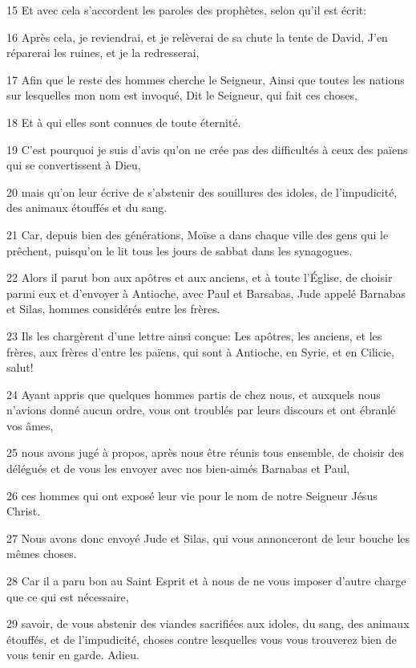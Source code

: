 \par 15 Et avec cela s'accordent les paroles des prophètes, selon qu'il est écrit:
\par 16 Après cela, je reviendrai, et je relèverai de sa chute la tente de David, J'en réparerai les ruines, et je la redresserai,
\par 17 Afin que le reste des hommes cherche le Seigneur, Ainsi que toutes les nations sur lesquelles mon nom est invoqué, Dit le Seigneur, qui fait ces choses,
\par 18 Et à qui elles sont connues de toute éternité.
\par 19 C'est pourquoi je suis d'avis qu'on ne crée pas des difficultés à ceux des païens qui se convertissent à Dieu,
\par 20 mais qu'on leur écrive de s'abstenir des souillures des idoles, de l'impudicité, des animaux étouffés et du sang.
\par 21 Car, depuis bien des générations, Moïse a dans chaque ville des gens qui le prêchent, puisqu'on le lit tous les jours de sabbat dans les synagogues.
\par 22 Alors il parut bon aux apôtres et aux anciens, et à toute l'Église, de choisir parmi eux et d'envoyer à Antioche, avec Paul et Barsabas, Jude appelé Barnabas et Silas, hommes considérés entre les frères.
\par 23 Ils les chargèrent d'une lettre ainsi conçue: Les apôtres, les anciens, et les frères, aux frères d'entre les païens, qui sont à Antioche, en Syrie, et en Cilicie, salut!
\par 24 Ayant appris que quelques hommes partis de chez nous, et auxquels nous n'avions donné aucun ordre, vous ont troublés par leurs discours et ont ébranlé vos âmes,
\par 25 nous avons jugé à propos, après nous être réunis tous ensemble, de choisir des délégués et de vous les envoyer avec nos bien-aimés Barnabas et Paul,
\par 26 ces hommes qui ont exposé leur vie pour le nom de notre Seigneur Jésus Christ.
\par 27 Nous avons donc envoyé Jude et Silas, qui vous annonceront de leur bouche les mêmes choses.
\par 28 Car il a paru bon au Saint Esprit et à nous de ne vous imposer d'autre charge que ce qui est nécessaire,
\par 29 savoir, de vous abstenir des viandes sacrifiées aux idoles, du sang, des animaux étouffés, et de l'impudicité, choses contre lesquelles vous vous trouverez bien de vous tenir en garde. Adieu.
